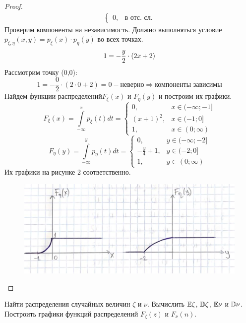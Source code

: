 \begin{proof}
\begin{gather*}
\begin{cases}
    0, & \text{в отс. сл.}
    \end{cases}
\end{gather*}
Проверим компоненты на независимость. Должно выполняться условие $p_{\xi,\eta}(x,y) = p_{\xi}(x)\cdot p_{\eta}(y)$ во всех точках.
\[
1 = -\frac{y}{2}\cdot(2x + 2)\\
\]
Рассмотрим точку (0,0):
\[
1 = -\frac{0}{2}\cdot(2\cdot 0 + 2) = 0 - \text{неверно}\Rightarrow\text{компоненты зависимы}
\]
Найдем функции распределений$F_{\xi}(x)$ и $F_{\eta}(y)$ и построим их графики.
\[
F_{\xi}(x) = \int\limits_{-\infty}^{x}p_{\xi}(t)dt = \begin{cases}
    0, & x\in (-\infty;-1]\\
    (x + 1)^2, & x\in (-1; 0]\\
    1, & x\in (0;\infty)
\end{cases}
\]
\[
F_{\eta}(y) = \int\limits_{-\infty}^{y}p_{\eta}(t)dt = \begin{cases}
    0, & y\in (-\infty;-2]\\
    -\frac{y}{4} + 1, & y\in (-2; 0]\\
    1, & y\in (0;\infty)
\end{cases}
\]
Их графики на рисунке 2 соответственно.
\begin{figure}[h!]
    \centering
    \includegraphics[width=0.5\linewidth]{2.jpeg}
    \caption{}
    \label{fig:enter-label}
\end{figure}
\end{proof}

\begin{problem}
Найти распределения случайных величин $\zeta$ и $\nu$. Вычислить $\mathbb E\zeta$, $\mathbb D\zeta$, $\mathbb E\nu$ и $\mathbb D\nu$. Построить графики функций распределений $F_{\zeta}(z)$ и $F_{\nu}(n)$.
\end{problem}

